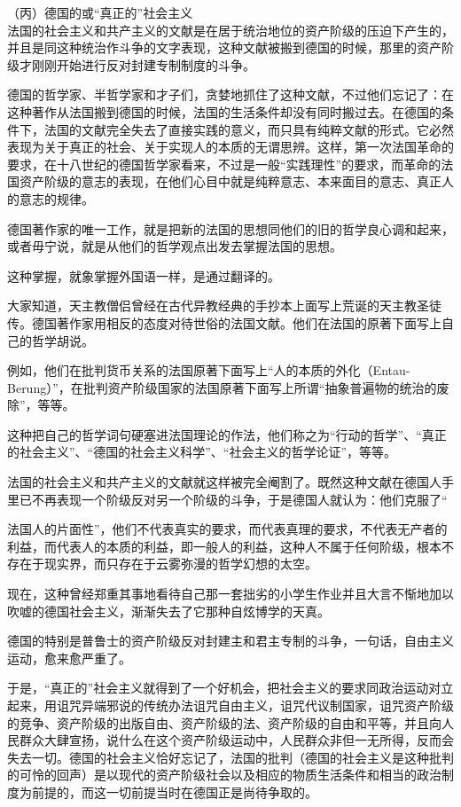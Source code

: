 \documentclass[UTF8]{ctexart}
\begin{document}
（丙）德国的或“真正的”社会主义
\\

法国的社会主义和共产主义的文献是在居于统治地位的资产阶级的压迫下产生的，并且是同这种统治作斗争的文字表现，这种文献被搬到德国的时候，那里的资产阶级才刚刚开始进行反对封建专制制度的斗争。

德国的哲学家、半哲学家和才子们，贪婪地抓住了这种文献，不过他们忘记了：在这种著作从法国搬到德国的时候，法国的生活条件却没有同时搬过去。在德国的条件下，法国的文献完全失去了直接实践的意义，而只具有纯粹文献的形式。它必然表现为关于真正的社会、关于实现人的本质的无谓思辨。这样，第一次法国革命的要求，在十八世纪的德国哲学家看来，不过是一般“实践理性”的要求，而革命的法国资产阶级的意志的表现，在他们心目中就是纯粹意志、本来面目的意志、真正人的意志的规律。

德国著作家的唯一工作，就是把新的法国的思想同他们的旧的哲学良心调和起来，或者毋宁说，就是从他们的哲学观点出发去掌握法国的思想。

这种掌握，就象掌握外国语一样，是通过翻译的。

大家知道，天主教僧侣曾经在古代异教经典的手抄本上面写上荒诞的天主教圣徒传。德国著作家用相反的态度对待世俗的法国文献。他们在法国的原著下面写上自己的哲学胡说。

例如，他们在批判货币关系的法国原著下面写上“人的本质的外化（Entau-Berung）”，在批判资产阶级国家的法国原著下面写上所谓“抽象普遍物的统治的废除”，等等。

这种把自己的哲学词句硬塞进法国理论的作法，他们称之为“行动的哲学”、“真正的社会主义”、“德国的社会主义科学”、“社会主义的哲学论证”，等等。

法国的社会主义和共产主义的文献就这样被完全阉割了。既然这种文献在德国人手里已不再表现一个阶级反对另一个阶级的斗争，于是德国人就认为：他们克服了“

法国人的片面性”，他们不代表真实的要求，而代表真理的要求，不代表无产者的利益，而代表人的本质的利益，即一般人的利益，这种人不属于任何阶级，根本不存在于现实界，而只存在于云雾弥漫的哲学幻想的太空。

现在，这种曾经郑重其事地看待自己那一套拙劣的小学生作业并且大言不惭地加以吹嘘的德国社会主义，渐渐失去了它那种自炫博学的天真。

德国的特别是普鲁士的资产阶级反对封建主和君主专制的斗争，一句话，自由主义运动，愈来愈严重了。

于是，“真正的”社会主义就得到了一个好机会，把社会主义的要求同政治运动对立起来，用诅咒异端邪说的传统办法诅咒自由主义，诅咒代议制国家，诅咒资产阶级的竞争、资产阶级的出版自由、资产阶级的法、资产阶级的自由和平等，并且向人民群众大肆宣扬，说什么在这个资产阶级运动中，人民群众非但一无所得，反而会失去一切。德国的社会主义恰好忘记了，法国的批判（德国的社会主义是这种批判的可怜的回声）是以现代的资产阶级社会以及相应的物质生活条件和相当的政治制度为前提的，而这一切前提当时在德国正是尚待争取的。
\end{document}
